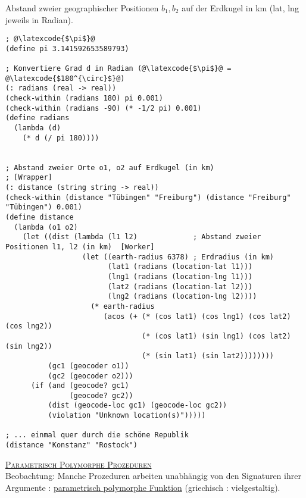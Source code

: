 Abstand zweier geographischer Positionen $b_1,b_2$ auf der Erdkugel in km (lat, lng jeweils in Radian).\\
\begin{mdframed}
\end{mdframed}
\begin{lstlisting}[frame = single]
; @\latexcode{$\pi$}@
(define pi 3.141592653589793)

; Konvertiere Grad d in Radian (@\latexcode{$\pi$}@ = @\latexcode{$180^{\circ}$}@)
(: radians (real -> real))
(check-within (radians 180) pi 0.001)
(check-within (radians -90) (* -1/2 pi) 0.001)
(define radians
  (lambda (d)
    (* d (/ pi 180))))


; Abstand zweier Orte o1, o2 auf Erdkugel (in km)
; [Wrapper]
(: distance (string string -> real))
(check-within (distance "Tübingen" "Freiburg") (distance "Freiburg" "Tübingen") 0.001)
(define distance
  (lambda (o1 o2)
    (let ((dist (lambda (l1 l2)             ; Abstand zweier Positionen l1, l2 (in km)  [Worker]
                  (let ((earth-radius 6378) ; Erdradius (in km)                  
                        (lat1 (radians (location-lat l1)))
                        (lng1 (radians (location-lng l1)))
                        (lat2 (radians (location-lat l2)))
                        (lng2 (radians (location-lng l2))))
                    (* earth-radius
                       (acos (+ (* (cos lat1) (cos lng1) (cos lat2) (cos lng2))
                                (* (cos lat1) (sin lng1) (cos lat2) (sin lng2))
                                (* (sin lat1) (sin lat2))))))))
          (gc1 (geocoder o1))
          (gc2 (geocoder o2)))
      (if (and (geocode? gc1)
               (geocode? gc2))
          (dist (geocode-loc gc1) (geocode-loc gc2))
          (violation "Unknown location(s)")))))

; ... einmal quer durch die schöne Republik
(distance "Konstanz" "Rostock")
\end{lstlisting}
\underline{\textsc{Parametrisch Polymorphe Prozeduren}}\\
Beobachtung: Manche Prozeduren arbeiten unabhängig von den Signaturen ihrer Argumente : \underline{parametrisch polymorphe Funktion} (griechisch : vielgestaltig).\\
